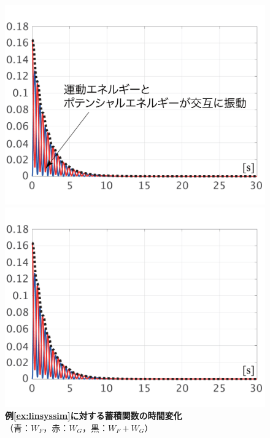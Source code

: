 \documentclass[tombow,dvipdfmx]{corona-a5-1.1}
\begin{document}
\begin{figure}[t]
  \centering
  {
  \begin{minipage}{0.49\linewidth}
    \centering
    \includegraphics[width = 1.0\linewidth]{figs/losslessW}
    \medskip
  \end{minipage}
  \begin{minipage}{0.49\linewidth}
    \centering
    \includegraphics[width = 1.0\linewidth]{figs/lossyW}
    \medskip
  \end{minipage}
  }
  \medskip
  \caption{\textbf{例\ref{ex:linsyssim}に対する蓄積関数の時間変化}
  \\  \centering（青：$W_F$，赤：$W_G$，黒：$W_F+W_G$）}
  \label{fig:LyapW}
\medskip
\end{figure}
\end{document}
